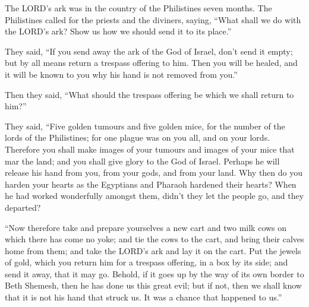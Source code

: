  The LORD's ark was in the country of the Philistines seven
months.  The Philistines called for the priests and the
diviners, saying, ``What shall we do with the LORD's ark? Show us how we
should send it to its place.''

 They said, ``If you send away the ark of the God of Israel,
don't send it empty; but by all means return a trespass offering to him.
Then you will be healed, and it will be known to you why his hand is not
removed from you.''

 Then they said, ``What should the trespass offering be
which we shall return to him?''

They said, ``Five golden tumours and five golden mice, for the number of
the lords of the Philistines; for one plague was on you all, and on your
lords.  Therefore you shall make images of your tumours and
images of your mice that mar the land; and you shall give glory to the
God of Israel. Perhaps he will release his hand from you, from your
gods, and from your land.  Why then do you harden your
hearts as the Egyptians and Pharaoh hardened their hearts? When he had
worked wonderfully amongst them, didn't they let the people go, and they
departed?

 ``Now therefore take and prepare yourselves a new cart and
two milk cows on which there has come no yoke; and tie the cows to the
cart, and bring their calves home from them;  and take the
LORD's ark and lay it on the cart. Put the jewels of gold, which you
return him for a trespass offering, in a box by its side; and send it
away, that it may go.  Behold, if it goes up by the way of
its own border to Beth Shemesh, then he has done us this great evil; but
if not, then we shall know that it is not his hand that struck us. It
was a chance that happened to us.''

